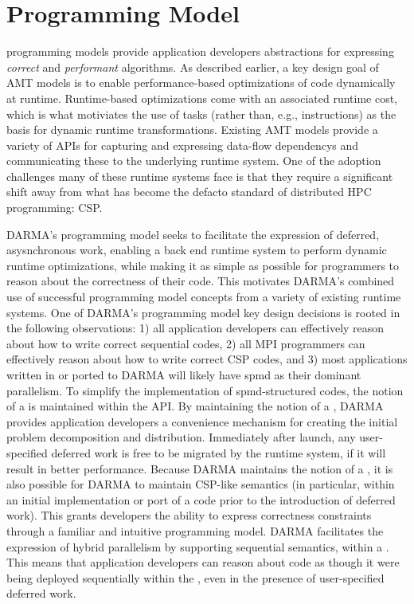 

\section{Programming Model}
\label{sec:programmingmodel}

\Glspl{programming model} provide application developers 
abstractions for expressing \emph{correct} and \emph{performant} algorithms. 
As described earlier, a key design goal of \gls{AMT} models is to enable performance-based
optimizations of code dynamically at runtime.
Runtime-based optimizations come with an associated runtime cost, which is what
motiviates the use of \glspl{task} (rather than, e.g., instructions) as the basis for dynamic runtime transformations.
Existing \gls{AMT} models provide a variety of \glspl{API} for capturing and expressing
\glspl{data-flow dependency} and communicating these to the underlying
\gls{runtime system}.  
One of the adoption challenges many of these \glspl{runtime system} face is
that they require a significant shift away from what has become
the defacto standard of distributed HPC programming: \gls{CSP}. 

\gls{DARMA}'s \gls{programming model} seeks to facilitate the expression of
deferred, asysnchronous work, enabling a \gls{back end} \gls{runtime system}
to perform dynamic runtime optimizations, while making it as simple as possible
for programmers to reason about the correctness of their code.
This motivates \gls{DARMA}'s combined use of successful \gls{programming model}
concepts from a variety of existing \glspl{runtime system}. 
One of \gls{DARMA}'s \gls{programming model} key design decisions is rooted in
the following observations: 
1) all application
developers can effectively reason about how to write correct sequential codes,
2) all MPI
programmers can effectively reason about how to write correct \gls{CSP} codes,
and
3) most applications written in or ported to \gls{DARMA} will likely
have \gls{spmd} as their dominant parallelism.
To simplify the implementation of \gls{spmd}-structured codes, the notion of a
 is maintained within the \gls{API}.   
By maintaining the notion of a , \gls{DARMA} provides application developers a convenience mechanism for creating
the initial problem decomposition and distribution.
Immediately after launch, any user-specified \gls{deferred work} is free to be
migrated by the \gls{runtime system}, if it will result in
better performance.
Because \gls{DARMA} maintains the notion of a , it is also
possible for \gls{DARMA} to maintain \gls{CSP}-like semantics (in particular, within an initial
implementation or port of a code prior to the introduction of \gls{deferred
work}). 
This grants developers the ability to express correctness constraints through a familiar and
intuitive \gls{programming model}.  
\gls{DARMA} facilitates the expression of hybrid parallelism by supporting  
\gls{sequential semantics}, within a .  This means that application
developers can reason about code as
though it were being deployed sequentially within the , even in
the presence of user-specified \gls{deferred work}.   

